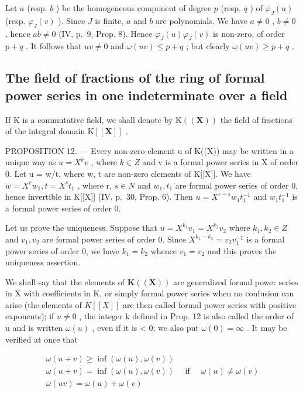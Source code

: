 Let \(a\) (resp. \(b\) ) be the homogeneous component of degree \(p\) (resp. \(q\) ) of \(\varphi_{J}(u)\) (resp. \(\varphi_{J}(v)\) ). Since \(J\) is finite, \(a\) and \(b\) are polynomials. We have \(a \neq 0\) , \(b \neq 0\) , hence \(ab \neq 0\) (IV, p.~9, Prop. 8). Hence \(\varphi_{J}(u) \varphi_{J}(v)\) is non-zero, of order \(p + q\) . It follows that \(uv \neq 0\) and \(\omega(uv) \leqslant p + q\) ; but clearly \(\omega(uv) \geqslant p + q\) .

\subsection{The field of fractions of the ring of formal power series in one indeterminate over a field}

If K is a commutative field, we shall denote by \(\mathrm{K}((\mathbf{X}))\) the field of fractions of the integral domain \(\mathrm{K}[[\mathbf{X}]]\) .

PROPOSITION 12. --- Every non-zero element u of K((X)) may be written in a unique way as \(u = X^{k}v\) , where \(k \in Z\) and v is a formal power series in X of order 0. Let u = w/t, where w, t are non-zero elements of K{[}{[}X{]}{]}. We have \(w = X^{r}w_{1}, t = X^{s}t_{1}\) , where r, \(s \in N\) and \(w_{1}, t_{1}\) are formal power series of order 0, hence invertible in K{[}{[}X{]}{]} (IV, p.~30, Prop. 6). Then \(u = X^{r-s}w_{1}t_{1}^{-1}\) and \(w_{1}t_{1}^{-1}\) is a formal power series of order 0.

Let us prove the uniqueness. Suppose that \(u = X^{k_{1}}v_{1} = X^{k_{2}}v_{2}\) where \(k_{1}, k_{2} \in Z\) and \(v_{1}, v_{2}\) are formal power series of order 0. Since \(X^{k_{1}-k_{2}} = v_{2}v_{1}^{-1}\) is a formal power series of order 0, we have \(k_{1} = k_{2}\) whence \(v_{1} = v_{2}\) and this proves the uniqueness assertion.

We shall say that the elements of \(\mathbf{K}((\mathbf{X}))\) are generalized formal power series in X with coefficients in K, or simply formal power series when no confusion can arise (the elements of \(K[[X]]\) are then called formal power series with positive exponents); if \(u \neq 0\) , the integer k defined in Prop. 12 is also called the order of u and is written \(\omega(u)\) , even if it is \textless{} 0; we also put \(\omega(0) = \infty\) . It may be verified at once that

\[
\begin{array}{l} \omega (u + v) \geqslant \inf (\omega (u), \omega (v)) \\ \omega (u + v) = \inf (\omega (u), \omega (v)) \quad \text { if } \quad \omega (u) \neq \omega (v) \\ \omega (u v) = \omega (u) + \omega (v) \end{array}
\]

